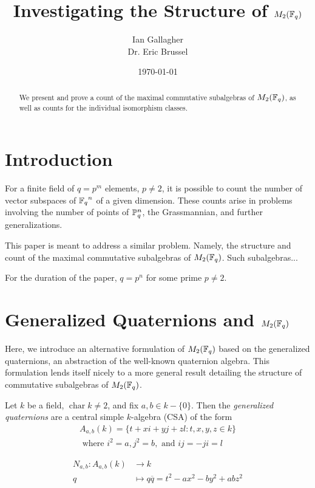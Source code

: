 \documentclass{amsart}
\title{Investigating the Structure of $M_2(\protect\mathbb{F}_q)$}
\author{Ian Gallagher \\ Dr. Eric Brussel}
\date{\today}
\begin{document}
\maketitle

\begin{abstract}
    We present and prove a count of the maximal commutative subalgebras of
    $M_2(\protect\mathbb{F}_q)$, as well as counts for the individual isomorphism classes. 
\end{abstract}

\section{Introduction}
For a finite field of $q = p^m$ elements, $p \neq 2$, it is possible to count the number of
vector subspaces of ${\protect\mathbb{F}_q}^n$ of a given dimension. These counts arise in
problems involving the number of points of $\protect\mathbb{P}^n_q$, the Grassmannian,
and further generalizations. %

This paper is meant to address a similar problem. Namely, the structure and 
count of the maximal commutative subalgebras of $M_2(\protect\mathbb{F}_q)$. Such
subalgebras...

For the duration of the paper, $q = p^n$ for some prime $p \neq 2$.

\section{Generalized Quaternions and $M_2(\protect\mathbb{F}_q)$}
Here, we introduce an alternative formulation of $M_2(\protect\mathbb{F}_q)$ based on the generalized quaternions, an abstraction of the well-known quaternion algebra. This formulation lends itself nicely to a more general result detailing the structure of commutative subalgebras of $M_2(\protect\mathbb{F}_q)$.

\begin{defn}
    Let $k$ be a field, $\operatorname{char} k \neq 2$, and fix $a,b \in k-\{0\}$. Then the \textit{generalized quaternions} are a central simple $k$-algebra (CSA) of the form 
\begin{gather*}
    A_{a,b}(k) = \{t + xi + yj + zl : t,x,y,z \in k\} \\
    \text{ where }i^2 =a, j^2 = b, \text{ and } ij = -ji=l
\end{gather*}
\end{defn}

\begin{defn}
\begin{align*}
    N_{a,b}:  A_{a,b}(k) & \rightarrow k  \\
    q & \mapsto q \overline{q} = t^2 -ax^2 -by^2 +abz^2 
\end{align*}
\end{defn}
\end{document}
